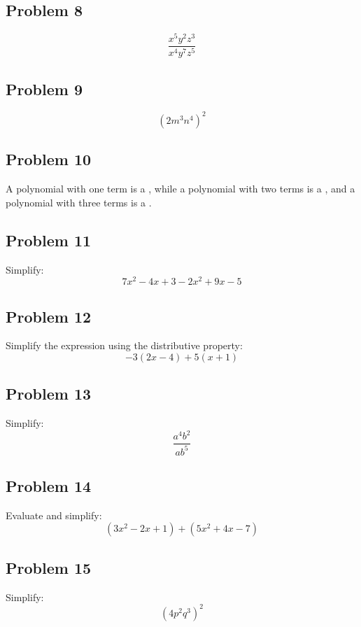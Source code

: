 \documentclass[12pt]{article}
\begin{document}
\subsection*{Problem 8}
\[
\frac{x^5 y^2 z^3}{x^4 y^7 z^5}
\]

\subsection*{Problem 9}
\[
(2m^3 n^4)^2
\]

\subsection*{Problem 10}
A polynomial with one term is a \underline{\hspace{3cm}}, while a polynomial with two terms is a \underline{\hspace{3cm}}, and a polynomial with three terms is a \underline{\hspace{3cm}}.

\subsection*{Problem 11}
Simplify:  
\[
7x^2 - 4x + 3 - 2x^2 + 9x - 5
\]

\subsection*{Problem 12}
Simplify the expression using the distributive property:  
\[
-3(2x - 4) + 5(x + 1)
\]

\subsection*{Problem 13}
Simplify:  
\[
\frac{a^4 b^2}{a b^5}
\]

\subsection*{Problem 14}
Evaluate and simplify:  
\[
(3x^2 - 2x + 1) + (5x^2 + 4x - 7)
\]

\subsection*{Problem 15}
Simplify:  
\[
(4p^2 q^3)^2
\]
\end{document}
